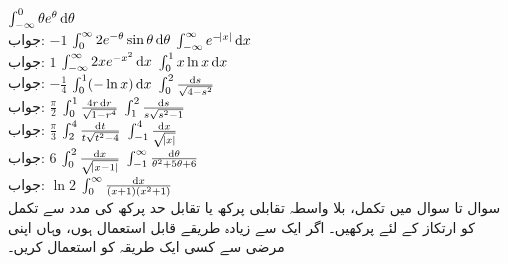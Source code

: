 $\int_{-\infty}^0\theta e^{\theta}\dif\theta$\\
جواب:\quad
$-1$
$\int_0^{\infty}2e^{-\theta}\sin\theta\dif\theta$
$\int_{-\infty}^{\infty}e^{-\abs{x}}\dif x$\\
جواب:\quad
$1$
$\int_{-\infty}^{\infty}2xe^{-x^2}\dif x$
$\int_0^1 x\ln x\dif x$\\
جواب:\quad
$-\tfrac{1}{4}$
$\int_0^1 (-\ln x)\dif x$
$\int_0^2 \frac{\dif s}{\sqrt{4-s^2}}$\\
جواب:\quad
$\tfrac{\pi}{2}$
$\int_0^1 \frac{4r\dif r}{\sqrt{1-r^4}}$
$\int_1^2\frac{\dif s}{s\sqrt{s^2-1}}$\\
جواب:\quad
$\tfrac{\pi}{3}$
$\int_2^4\frac{\dif t}{t\sqrt{t^2-4}}$
$\int_{-1}^4\frac{\dif x}{\sqrt{\abs{x}}}$\\
جواب:\quad
$6$
$\int_0^2\frac{\dif x}{\sqrt{\abs{x-1}}}$
$\int_{-1}^{\infty}\frac{\dif \theta}{\theta^2+5\theta+6}$\\
جواب:\quad
$\ln 2$
$\int_0^{\infty}\frac{\dif x}{(x+1)(x^2+1)}$
\\
سوال  تا سوال  میں تکمل، بلا واسطہ تقابلی پرکھ یا تقابل حد پرکھ کی مدد سے تکمل کو ارتکاز کے لئے پرکھیں۔ اگر ایک سے زیادہ طریقے قابل استعمال ہوں، وہاں اپنی مرضی سے کسی ایک طریقہ کو استعمال کریں۔

